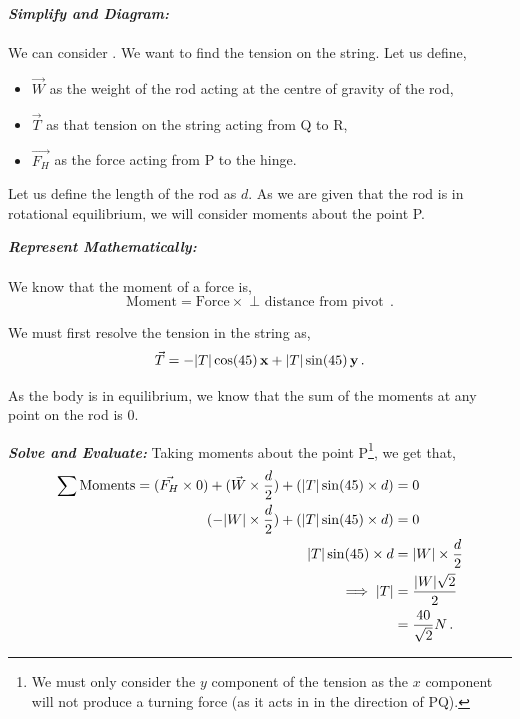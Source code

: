 \begin{subquestions}
\begin{subsubquestions}
\subsubquestion

\textbf{\textit{Simplify and Diagram:}} \\ \\
We can consider . We want to find the tension on the string. Let us define,
\begin{itemize}
	\item $\vec{W}$ as the weight of the rod acting at the centre of gravity of the rod,
	\item $\vec{T}$ as that tension on the string acting from Q to R,
	\item $\vec{F_H}$ as the force acting from P to the hinge.  
\end{itemize}
Let us define the length of the rod as $d$. As we are given that the rod is in rotational equilibrium, we will consider moments about the point P.




\textbf{\textit{Represent Mathematically:}} \\ \\ 
We know that the moment of a force is,
\begin{equation}
	\text{Moment} = \text{Force} \times \text{$\perp$ distance from pivot} \,.
\end{equation}

We must first resolve the tension in the string as,
\begin{equation}
	\vec{T} = -|T|\cos(45)\,\mathbf{x} + |T|\sin(45)\,\mathbf{y} \,.
\end{equation}

As the body is in equilibrium, we know that the sum of the moments at any point on the rod is 0.




\textbf{\textit{Solve and Evaluate:}}
Taking moments about the point P\footnote{We must only consider the $y$ component of the tension as the $x$ component will not produce a turning force (as it acts in in the direction of PQ).}, we get that,
\begin{align}
	\sum \text{Moments} = (\vec{F_H}\times 0) + (\vec{W} \times \frac{d}{2}) + (|T|\sin(45) \times d) & = 0 \nonumber \\
	                                             (-|W| \times \frac{d}{2}) + (|T|\sin(45) \times d) & = 0 \nonumber \\
	                                                                |T|\sin(45) \times d & = |W| \times \frac{d}{2} \nonumber \\
	                                                                \implies |T| & = \frac{|W|\sqrt{2}}{2} \nonumber \\
	                                                                             & = \frac{40}{\sqrt{2}}N \,. 
\end{align}


\end{subsubquestions}
\end{subquestions}
